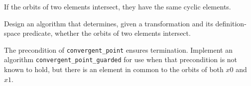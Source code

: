 \begin{lemma}
	If the orbits of two elements intersect, they have the same
	cyclic elements.
\end{lemma}

\begin{exercise}
	Design an algorithm that determines, given a transformation and its definition-space predicate,
	whether the orbits of two elements intersect.
\end{exercise}

\begin{exercise}
	The precondition of \verb|convergent_point| ensures termination. Implement an algorithm
	\verb|convergent_point_guarded| for use when that precondition is not known to hold, but
	there is an element in common to the orbits of both $x0$ and $x1$.
\end{exercise}
